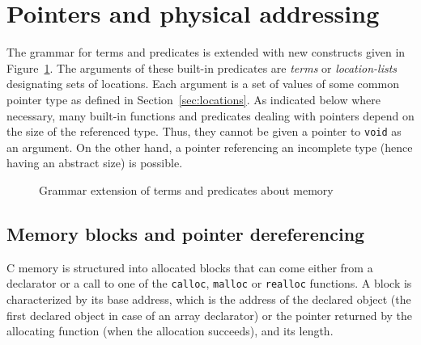 

\section{Pointers and physical addressing}
\label{sec:pointers}
The grammar for terms and predicates is
extended with new constructs given in Figure~\ref{fig:gram:memory}.
The arguments of these built-in predicates are \textsl{terms} or \textsl{location-lists} designating sets of locations.
Each argument is a set of values of some common pointer type as defined in Section~\ref{sec:locations}. As indicated below where necessary,
many built-in functions and predicates dealing with
pointers depend on the size of the referenced type. Thus, they cannot be given
a pointer to \lstinline|void| as an argument. On the
other hand, a pointer referencing an incomplete type (hence having an
abstract size) is possible.

\begin{figure}[htp]
  \begin{cadre}
      
    \end{cadre}
  \caption{Grammar extension of terms and predicates about memory}
\label{fig:gram:memory}
\end{figure}



\subsection{Memory blocks and pointer dereferencing}
\label{subsec:memory}
C memory is structured into allocated blocks that can come either from a
declarator or a call to one of the \lstinline|calloc|, \lstinline|malloc| or
\lstinline|realloc| functions. A block is characterized by its base address,
which is the address of the declared object (the first declared object
in case of an array declarator) or the pointer returned by the allocating
function (when the allocation succeeds), and its length.

